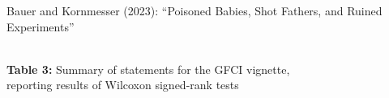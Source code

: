 \documentclass[xcolor=table,9pt,aspectratio=169]{beamer}
\begin{document}
\begin{frame}{\vspace*{10mm}Bauer and Kornmesser (2023): ``Poisoned Babies, Shot Fathers, and Ruined Experiments''}
\vspace*{-5mm}
\begin{center}
   \\
   {\footnotesize\textbf{Table 3:} Summary of statements for the GFCI vignette,\\reporting results of Wilcoxon signed-rank tests}
\end{center}
\end{frame}
\end{document}

